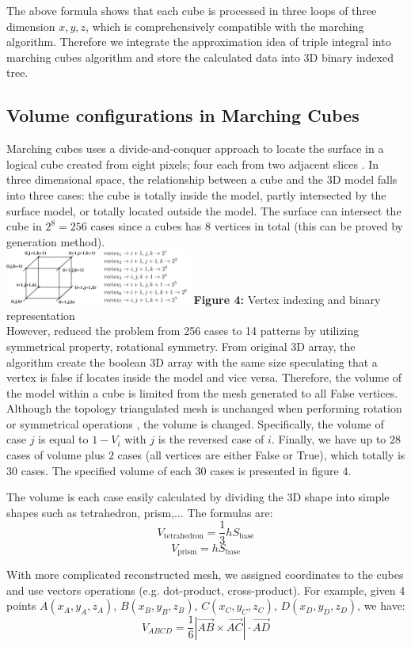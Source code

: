\documentclass[11pt]{article}
\begin{document}
\begin{multicols}{2}
The above formula shows that each cube is processed in three loops of three dimension $x,y,z$, which is comprehensively compatible with the marching algorithm. Therefore we integrate the approximation idea of triple integral into marching cubes algorithm and store the calculated data into 3D binary indexed tree.

\subsection{Volume configurations in Marching Cubes}

Marching cubes uses a divide-and-conquer approach to locate the surface in a logical cube created from eight pixels; four each from two adjacent slices \cite{loren}. In three dimensional space, the relationship between a cube and the 3D model falls into three cases: the cube is totally inside the model, partly intersected by the surface model, or totally located outside the model. The surface can intersect the cube in $2^8=256$ cases since a cubes has $8$ vertices in total (this can be proved by generation method). \\

\includegraphics[width=0.46\textwidth]{Figures/Binary Vertices.png}
\textbf{Figure 4:} Vertex indexing and binary representation  \\

However, \cite{loren} reduced the problem from 256 cases to 14 patterns by utilizing symmetrical property, rotational symmetry. From original 3D array, the algorithm create the boolean 3D array with the same size speculating that a vertex is false if locates inside the model and vice versa. Therefore, the volume of the model within a cube is limited from the mesh generated to all False vertices. Although the topology triangulated mesh is unchanged when performing rotation or symmetrical operations \cite{loren}, the volume is changed. Specifically, the volume of case $j$ is equal to $1-V_i$ with $j$ is the reversed case of $i$. Finally, we have up to $28$ cases of volume plus $2$ cases (all vertices are either False or True), which totally is $30$ cases. The specified volume of each $30$ cases is presented in figure $4$.

The volume is each case easily calculated by dividing the 3D shape into simple shapes such as tetrahedron, prism,... The formulas are:
$$ V_{\text{tetrahedron}} = \frac{1}{3} h S_{\text{base}} $$
$$ V_{\text{prism}} = h S_{\text{base}} $$ 

With more complicated reconstructed mesh, we assigned coordinates to the cubes and use vectors operations (e.g. dot-product, cross-product). For example, given 4 points $A(x_A,y_A,z_A)$, $B(x_B,y_B,z_B)$, $C(x_C,y_C,z_C)$, $D(x_D,y_D,z_D)$, we have:
$$
V_{ABCD} = \frac{1}{6} |\Vec{AB} \times \Vec{AC}| \cdot \Vec{AD}
$$
\end{multicols}
\end{document}
